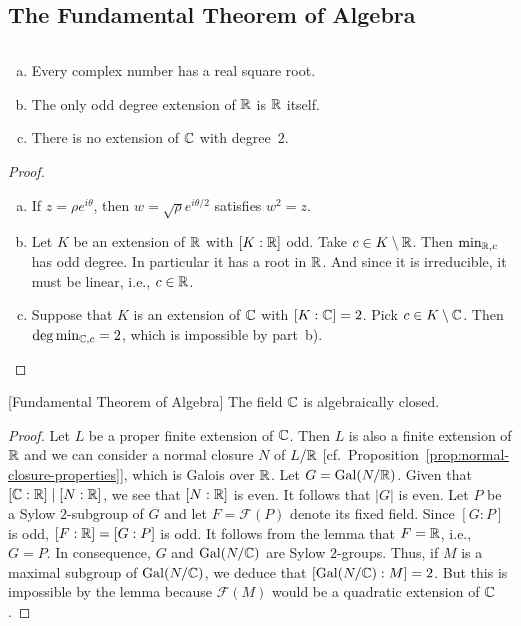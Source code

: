 \subsection{The Fundamental Theorem of Algebra}

\begin{lem}${}$
    \begin{enumerate}[a), font=\upshape]
        \item Every complex number has a real square root.
        \item The only odd degree extension of\/ $\mathbb{R}$ is\/ $\mathbb{R}$ itself.
        \item There is no extension of $\mathbb{C}$ with degree~$2$.
    \end{enumerate}
\end{lem}

\begin{proof}${}$
    \begin{enumerate}[a), font=\upshape]
        \item If $z=\rho e^{i\theta}$, then $w=\sqrt\rho e^{i\theta/2}$ satisfies $w^2=z$.

        \item Let $K$ be an extension of $\mathbb{R}$ with $[K:\mathbb{R}]$ odd. Take $c\in K\setminus\mathbb{R}$. Then $\operatorname{min}_{\mathbb{R},c}$ has odd degree. In particular it has a root in $\mathbb{R}$. And since it is irreducible, it must be linear, i.e., $c\in\mathbb{R}$.

        \item Suppose that $K$ is an extension of $\mathbb{C}$ with $[K:\mathbb{C}]=2$. Pick $c\in K\setminus\mathbb{C}$. Then $\deg\operatorname{min}_{\mathbb{C},c}=2$, which is impossible by part~b). \qedhere
    \end{enumerate}
\end{proof}

    \begin{thm} {\rm[Fundamental Theorem of Algebra]} The field\/ $\mathbb{C}$ is algebraically closed. 
\end{thm}

\begin{proof}
    Let $L$ be a proper finite extension of $\mathbb{C}$. Then $L$ is also a finite extension of $\mathbb{R}$ and we can consider a normal closure $N$ of $L/\mathbb{R}$ [cf.~Proposition~\ref{prop:normal-closure-properties}], which is Galois over $\mathbb{R}$. Let $G=\operatorname{Gal}(N/\mathbb{R})$. Given that $[\mathbb{C}:\mathbb{R}]\mid[N:\mathbb{R}]$, we see that $[N:\mathbb{R}]$ is even. It follows that $|G|$ is even. Let $P$ be a Sylow $2$-subgroup of $G$ and let $F=\mathcal F(P)$ denote its fixed field. Since $[G:P]$ is odd, $[F:\mathbb{R}]=[G:P]$ is odd. It follows from the lemma that $F=\mathbb{R}$, i.e., $G=P$. In consequence, $G$ and $\operatorname{Gal}(N/\mathbb{C})$ are Sylow $2$-groups. Thus, if $M$ is a maximal subgroup of $\operatorname{Gal}(N/\mathbb{C})$, we deduce that $[\operatorname{Gal}(N/\mathbb{C}):M]=2$. But this is impossible by the lemma because $\mathcal F(M)$ would be a quadratic extension of $\mathbb{C}$.
\end{proof}

